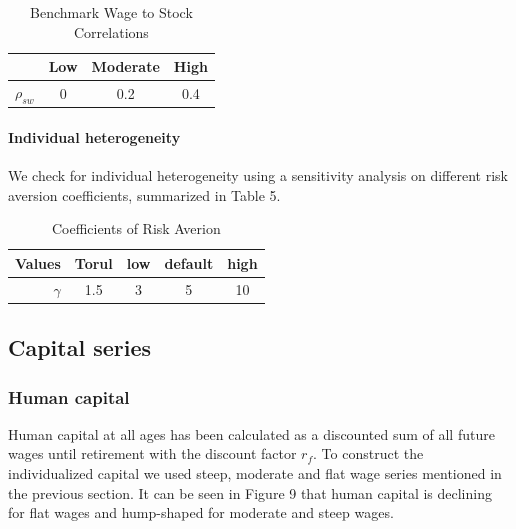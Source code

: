 \documentclass[]{article}
\begin{document}
\begin{table}
	\centering
	\caption{Benchmark Wage to Stock Correlations}
	\begin{tabular}[c]{c|ccc}
		&Low&Moderate&High\\
		\hline
		$\rho_{sw}$&0&0.2&0.4
	\end{tabular}
\end{table}


\paragraph{Individual heterogeneity}

We check for individual heterogeneity using a sensitivity analysis on different risk aversion coefficients, summarized in Table 5.

\begin{table}
	\centering
	\caption{Coefficients of Risk Averion}
	\begin{tabular}[c]{r|cccc}
		Values&Torul&low&default&high\\
		\hline
		$\gamma$&1.5&3&5&10\\
	\end{tabular}
\end{table}

\subsection{Capital series}

\subsubsection{Human capital}
Human capital at all ages has been calculated as a discounted sum of all future wages until retirement with the discount factor $r_f$. To construct the individualized capital we used steep, moderate and flat wage series mentioned in the previous section. It can be seen in Figure 9 that human capital is declining for flat wages and hump-shaped for moderate and steep wages. 
\end{document}
